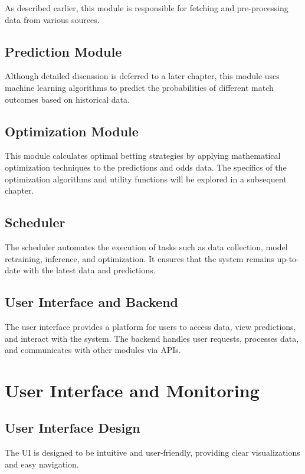 As described earlier, this module is responsible for fetching and pre-processing data from various sources.

\subsection{Prediction Module}

Although detailed discussion is deferred to a later chapter, this module uses machine learning algorithms to predict the probabilities of different match outcomes based on historical data.

\subsection{Optimization Module}

This module calculates optimal betting strategies by applying mathematical optimization techniques to the predictions and odds data. The specifics of the optimization algorithms and utility functions will be explored in a subsequent chapter.

\subsection{Scheduler}

The scheduler automates the execution of tasks such as data collection, model retraining, inference, and optimization. It ensures that the system remains up-to-date with the latest data and predictions.

\subsection{User Interface and Backend}

The user interface provides a platform for users to access data, view predictions, and interact with the system. The backend handles user requests, processes data, and communicates with other modules via APIs.

\section{User Interface and Monitoring}

\subsection{User Interface Design}

The UI is designed to be intuitive and user-friendly, providing clear visualizations and easy navigation.

